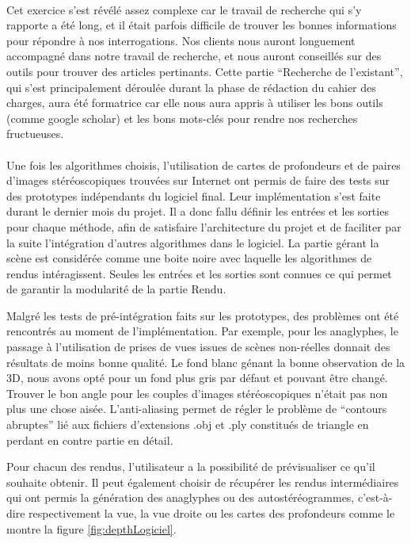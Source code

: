 \paragraph{}
Cet exercice s'est révélé assez complexe car le travail de recherche qui s'y rapporte a été long, et il était parfois difficile de trouver les bonnes informations pour répondre à nos interrogations. Nos clients nous auront longuement accompagné dans notre travail de recherche, et nous auront conseillés sur des outils pour trouver des articles pertinants. Cette partie ``Recherche de l'existant'', qui s'est principalement déroulée durant la phase de rédaction du cahier des charges, aura été formatrice car elle nous aura appris à utiliser les bons outils (comme google scholar\footnotemark) et les bons mots-clés pour rendre nos recherches fructueuses.

\paragraph{}
Une fois les algorithmes choisis, l'utilisation de cartes de profondeurs et de paires d'images stéréoscopiques trouvées sur Internet ont permis de faire des tests sur des prototypes indépendants du logiciel final. Leur implémentation s'est faite durant le dernier mois du projet. Il a donc fallu définir les entrées et les sorties pour chaque méthode, afin de satisfaire l'architecture du projet et de faciliter par la suite l'intégration d'autres algorithmes dans le logiciel.
La partie gérant la scène est considérée comme une boite noire avec laquelle les algorithmes de rendus intéragissent. Seules les entrées et les sorties sont connues ce qui permet de garantir la modularité de la partie Rendu. 


Malgré les tests de pré-intégration faits sur les prototypes, des problèmes ont été rencontrés au moment de l'implémentation. Par exemple, pour les anaglyphes, le passage à l'utilisation de prises de vues issues de scènes non-réelles donnait des résultats de moins bonne qualité. Le fond blanc génant la bonne observation de la 3D, nous avons opté pour un fond plus gris par défaut et pouvant être changé. Trouver le bon angle pour les couples d'images stéréoscopiques n'était pas non plus une chose aisée. L'anti-aliasing permet de régler le problème de ``contours abruptes'' lié aux fichiers d'extensions .obj et .ply constitués de triangle en perdant en contre partie en détail.


Pour chacun des rendus, l'utilisateur a la possibilité de prévisualiser ce qu'il souhaite obtenir. Il peut également choisir de récupérer les rendus intermédiaires qui ont permis la génération des anaglyphes ou des autostéréogrammes, c'est-à-dire respectivement la vue, la vue droite ou les cartes des profondeurs comme le montre la figure \ref{fig:depthLogiciel}.

